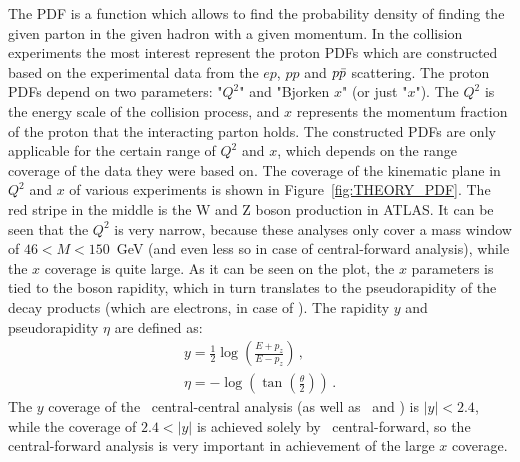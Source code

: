 \begin{figure}
\end{figure}

The PDF is a function which allows to find the probability density of finding the given parton in the given hadron with a given momentum. In the collision experiments the most interest represent the proton PDFs which are constructed based on the experimental data from the $ep$, $pp$ and $p\bar{p}$ scattering. The proton PDFs depend on two parameters: "$Q^{2}$" and "Bjorken $x$" (or just "$x$"). The $Q^{2}$ is the energy scale of the collision process, and $x$ represents the momentum fraction of the proton that the interacting parton holds. The constructed PDFs are only applicable for the certain range of $Q^{2}$ and $x$, which depends on the range coverage of the data they were based on. The coverage of the kinematic plane in $Q^{2}$ and $x$ of various experiments is shown in Figure~\ref{fig:THEORY_PDF}. The red stripe in the middle is the W and Z boson production in ATLAS. It can be seen that the $Q^{2}$ is very narrow, because these analyses only cover a mass window of $46 < M < 150$~GeV (and even less so in case of central-forward analysis), while the $x$ coverage is quite large. As it can be seen on the plot, the $x$ parameters is tied to the boson rapidity, which in turn translates to the pseudorapidity of the decay products (which are electrons, in case of \Zee). The rapidity $y$ and pseudorapidity $\eta$ are defined as:
\begin{equation}
\begin{gathered}
y = \frac{1}{2} \log \left(\frac{E+p_z}{E-p_z}\right)\,, \\
\eta = - \log (\tan (\frac{\theta}{2}))\,.
\end{gathered}
\end{equation}
The $y$ coverage of the \Zee\ central-central analysis (as well as \Zmm\ and \Wenu) is $|y| < 2.4$, while the coverage of $2.4 < |y|$ is achieved solely by \Zee\ central-forward, so the central-forward analysis is very important in achievement of the large $x$ coverage.

